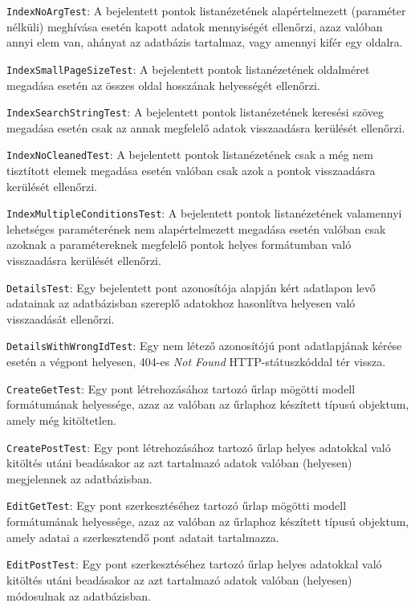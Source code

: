 \begin{compactitem}
	\item \texttt{IndexNoArgTest}: A bejelentett pontok listanézetének alapértelmezett (paraméter nélküli) meghívása esetén kapott adatok mennyiségét ellenőrzi, azaz valóban annyi elem van, ahányat az adatbázis tartalmaz, vagy amennyi kifér egy oldalra.
	\item \texttt{IndexSmallPageSizeTest}: A bejelentett pontok listanézetének oldalméret megadása esetén az összes oldal hosszának helyességét ellenőrzi.
	\item \texttt{IndexSearchStringTest}: A bejelentett pontok listanézetének keresési szöveg megadása esetén csak az annak megfelelő adatok visszaadásra kerülését ellenőrzi.
	\item \texttt{IndexNoCleanedTest}: A bejelentett pontok listanézetének csak a még nem tisztított elemek megadása esetén valóban csak azok a pontok visszaadásra kerülését ellenőrzi.
	\item \texttt{IndexMultipleConditionsTest}: A bejelentett pontok listanézetének valamennyi lehetséges paraméterének nem alapértelmezett megadása esetén valóban csak azoknak a paramétereknek megfelelő pontok helyes formátumban való visszaadásra kerülését ellenőrzi.
	\item \texttt{DetailsTest}: Egy bejelentett pont azonosítója alapján kért adatlapon levő adatainak az adatbázisban szereplő adatokhoz hasonlítva helyesen való visszaadását ellenőrzi.
	\item \texttt{DetailsWithWrongIdTest}: Egy nem létező azonosítójú pont adatlapjának kérése esetén a végpont helyesen, 404-es \textit{Not Found} HTTP-státuszkóddal tér vissza.
	\item \texttt{CreateGetTest}: Egy pont létrehozásához tartozó űrlap mögötti modell formátumának helyessége, azaz az valóban az űrlaphoz készített típusú objektum, amely még kitöltetlen.
	\item \texttt{CreatePostTest}: Egy pont létrehozásához tartozó űrlap helyes adatokkal való kitöltés utáni beadásakor az azt tartalmazó adatok valóban (helyesen) megjelennek az adatbázisban.
	\item \texttt{EditGetTest}: Egy pont szerkesztéséhez tartozó űrlap mögötti modell formátumának helyessége, azaz az valóban az űrlaphoz készített típusú objektum, amely adatai a szerkesztendő pont adatait tartalmazza.
	\item \texttt{EditPostTest}: Egy pont szerkesztéséhez tartozó űrlap helyes adatokkal való kitöltés utáni beadásakor az azt tartalmazó adatok valóban (helyesen) módosulnak az adatbázisban.

\end{compactitem}
